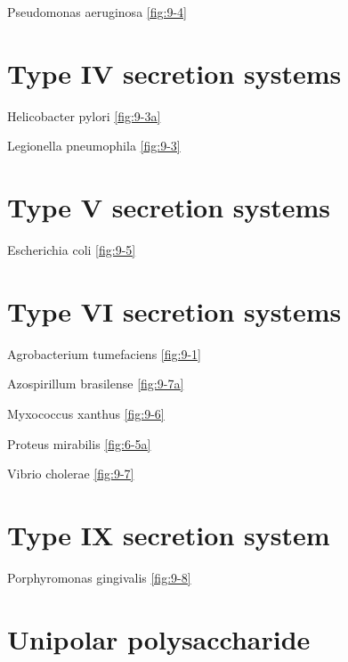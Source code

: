 \documentclass[]{tufte-book}
\begin{document}
Pseudomonas aeruginosa \ref{fig:9-4}

\hypertarget{type-iv-secretion-systems}{%
\section*{Type IV secretion systems}\label{type-iv-secretion-systems}}

Helicobacter pylori \ref{fig:9-3a}

Legionella pneumophila \ref{fig:9-3}

\hypertarget{type-v-secretion-systems}{%
\section*{Type V secretion systems}\label{type-v-secretion-systems}}

Escherichia coli \ref{fig:9-5}

\hypertarget{type-vi-secretion-systems}{%
\section*{Type VI secretion systems}\label{type-vi-secretion-systems}}

Agrobacterium tumefaciens \ref{fig:9-1}

Azospirillum brasilense \ref{fig:9-7a}

Myxococcus xanthus \ref{fig:9-6}

Proteus mirabilis \ref{fig:6-5a}

Vibrio cholerae \ref{fig:9-7}

\hypertarget{type-ix-secretion-system-1}{%
\section*{Type IX secretion system}\label{type-ix-secretion-system-1}}

Porphyromonas gingivalis \ref{fig:9-8}

\hypertarget{unipolar-polysaccharide}{%
\section*{Unipolar polysaccharide}\label{unipolar-polysaccharide}}
\end{document}
